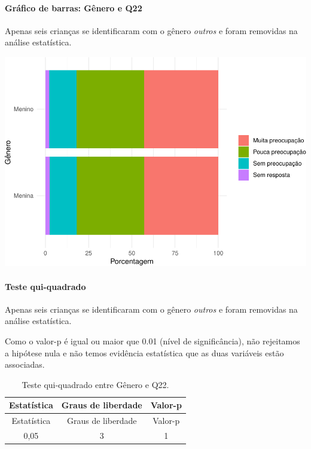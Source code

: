 \documentclass[]{article}
\let\oldparagraph\paragraph
\renewcommand{\paragraph}[1]{\oldparagraph{#1}\mbox{}}
\begin{document}
\hypertarget{gruxe1fico-de-barras-guxeanero-e-q22}{%
\paragraph{Gráfico de barras: Gênero e Q22}\label{gruxe1fico-de-barras-guxeanero-e-q22}}

Apenas seis crianças se identificaram com o gênero \emph{outros} e foram removidas na análise estatística.

\begin{center}\includegraphics[width=0.75\linewidth]{relatorio_covid19_files/figure-latex/unnamed-chunk-496-1} \end{center}

\hypertarget{teste-qui-quadrado-43}{%
\paragraph{Teste qui-quadrado}\label{teste-qui-quadrado-43}}

Apenas seis crianças se identificaram com o gênero \emph{outros} e foram removidas na análise estatística.

Como o valor-p é igual ou maior que 0.01 (nível de significância), não rejeitamos a hipótese nula e não temos evidência estatística que as duas variáveis estão associadas.

\begin{longtable}[]{@{}ccc@{}}
\caption{\label{tab:unnamed-chunk-498}Teste qui-quadrado entre Gênero e Q22.}\tabularnewline
\toprule
Estatística & Graus de liberdade & Valor-p\tabularnewline
\midrule
\endfirsthead
\toprule
Estatística & Graus de liberdade & Valor-p\tabularnewline
\midrule
\endhead
0,05 & 3 & 1\tabularnewline
\bottomrule
\end{longtable}

\cleardoublepage
\end{document}
